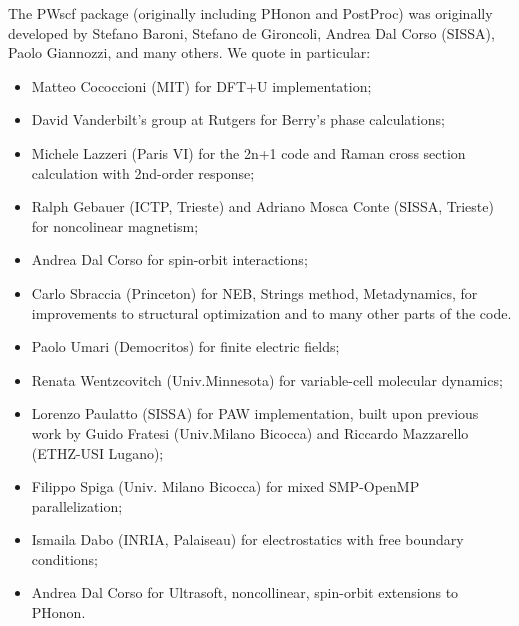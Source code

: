 \documentclass[12pt,a4paper]{article}
\begin{document}
The PWscf package (originally including PHonon and PostProc)
was originally developed by Stefano Baroni, Stefano
de Gironcoli, Andrea Dal Corso (SISSA), Paolo Giannozzi, and many others.
We quote in particular:
\begin{itemize}
  \item Matteo Cococcioni (MIT) for DFT+U implementation;
  \item David Vanderbilt's group at Rutgers for Berry's phase
  calculations;
  \item Michele Lazzeri (Paris VI) for the 2n+1 code and Raman 
  cross section calculation with 2nd-order response;
  \item Ralph Gebauer (ICTP, Trieste) and Adriano Mosca Conte
  (SISSA, Trieste) for noncolinear magnetism;
  \item Andrea Dal Corso for spin-orbit interactions;
  \item Carlo Sbraccia (Princeton) for NEB, Strings method,
  Metadynamics, for improvements to structural optimization
  and to many other parts of the code.
  \item Paolo Umari (Democritos) for finite electric fields;
  \item Renata Wentzcovitch (Univ.Minnesota) for variable-cell
   molecular dynamics;
  \item Lorenzo Paulatto (SISSA) for PAW implementation, built 
  upon previous work by Guido Fratesi (Univ.Milano Bicocca)
  and Riccardo Mazzarello (ETHZ-USI Lugano);
\item Filippo Spiga (Univ. Milano Bicocca) for mixed SMP-OpenMP
 parallelization;
 \item Ismaila Dabo (INRIA, Palaiseau) for electrostatics with
 free boundary conditions;
 \item Andrea Dal Corso for Ultrasoft, noncollinear, spin-orbit
 extensions to PHonon.
\end{itemize}
\end{document}
